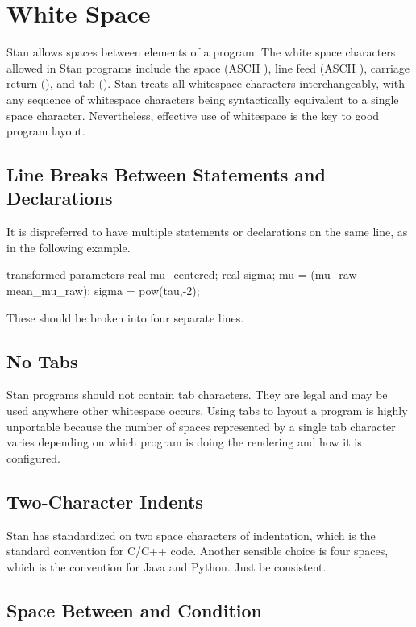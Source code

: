 \section{White Space}

Stan allows spaces between elements of a program.  The white space
characters allowed in Stan programs include the space (ASCII
), line feed (ASCII ), carriage return
(), and tab ().  Stan treats all whitespace
characters interchangeably, with any sequence of whitespace characters
being syntactically equivalent to a single space character.
Nevertheless, effective use of whitespace is the key to good program
layout.


\subsection{Line Breaks Between Statements and Declarations}

It is dispreferred to have multiple statements or declarations on the
same line, as in the following example.
%
\begin{stancode}
transformed parameters {
  real mu_centered;  real sigma;
  mu = (mu_raw - mean_mu_raw);    sigma = pow(tau,-2);
}
\end{stancode}
%
These should be broken into four separate lines.

\subsection{No Tabs}

Stan programs should not contain tab characters.  They are legal and
may be used anywhere other whitespace occurs.  Using tabs to layout a
program is highly unportable because the number of spaces
represented by a single tab character varies depending on which
program is doing the rendering and how it is configured.  

\subsection{Two-Character Indents}

Stan has standardized on two space characters of indentation, which is
the standard convention for C/C++ code.  Another sensible choice is
four spaces, which is the convention for Java and Python.  Just be
consistent.  

\subsection{Space Between  and Condition}

